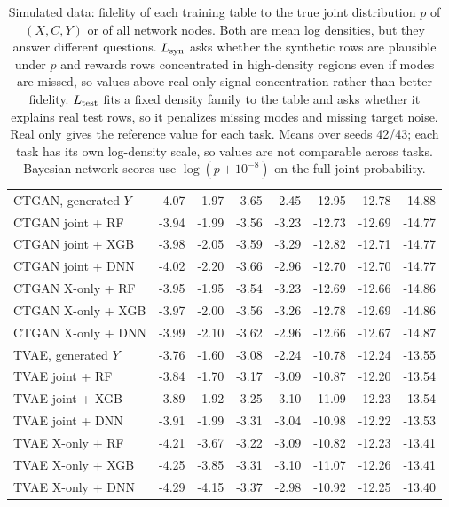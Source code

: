 \begin{table}[p]
\begin{tabular}{@{}lrrrrrrr@{}}
\midrule
CTGAN, generated $Y$ & -4.07 & -1.97 & -3.65 & -2.45 & -12.95 & -12.78 & -14.88 \\
CTGAN joint + RF & -3.94 & -1.99 & -3.56 & -3.23 & -12.73 & -12.69 & -14.77 \\
CTGAN joint + XGB & -3.98 & -2.05 & -3.59 & -3.29 & -12.82 & -12.71 & -14.77 \\
CTGAN joint + DNN & -4.02 & -2.20 & -3.66 & -2.96 & -12.70 & -12.70 & -14.77 \\
CTGAN X-only + RF & -3.95 & -1.95 & -3.54 & -3.23 & -12.69 & -12.66 & -14.86 \\
CTGAN X-only + XGB & -3.97 & -2.00 & -3.56 & -3.26 & -12.78 & -12.69 & -14.86 \\
CTGAN X-only + DNN & -3.99 & -2.10 & -3.62 & -2.96 & -12.66 & -12.67 & -14.87 \\
\addlinespace
TVAE, generated $Y$ & -3.76 & -1.60 & -3.08 & -2.24 & -10.78 & -12.24 & -13.55 \\
TVAE joint + RF & -3.84 & -1.70 & -3.17 & -3.09 & -10.87 & -12.20 & -13.54 \\
TVAE joint + XGB & -3.89 & -1.92 & -3.25 & -3.10 & -11.09 & -12.23 & -13.54 \\
TVAE joint + DNN & -3.91 & -1.99 & -3.31 & -3.04 & -10.98 & -12.22 & -13.53 \\
TVAE X-only + RF & -4.21 & -3.67 & -3.22 & -3.09 & -10.82 & -12.23 & -13.41 \\
TVAE X-only + XGB & -4.25 & -3.85 & -3.31 & -3.10 & -11.07 & -12.26 & -13.41 \\
TVAE X-only + DNN & -4.29 & -4.15 & -3.37 & -2.98 & -10.92 & -12.25 & -13.40 \\
\bottomrule
\end{tabular}
\caption{Simulated data: fidelity of each training table to the true joint distribution $p$ of $(X, C, Y)$ or of all network nodes. Both are mean log densities, but they answer different questions. $L_{\rm syn}$ asks whether the synthetic rows are plausible under $p$ and rewards rows concentrated in high-density regions even if modes are missed, so values above real only signal concentration rather than better fidelity. $L_{\rm test}$ fits a fixed density family to the table and asks whether it explains real test rows, so it penalizes missing modes and missing target noise. Real only gives the reference value for each task. Means over seeds 42/43; each task has its own log-density scale, so values are not comparable across tasks. Bayesian-network scores use $\log(p+10^{-8})$ on the full joint probability.}
\label{tab:sim-fidelity}
\end{table}
